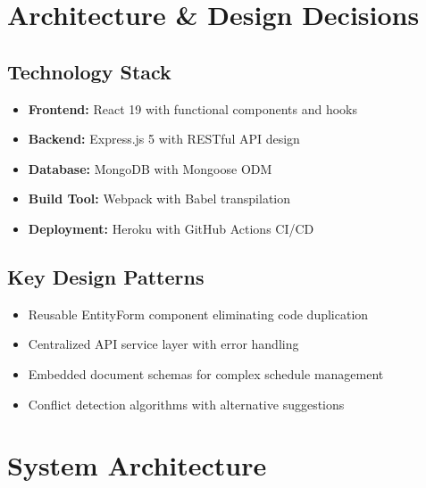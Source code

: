 \documentclass[11pt,a4paper]{article}
\begin{document}
\section{Architecture \& Design Decisions}

\subsection{Technology Stack}
\begin{itemize}
    \item \textbf{Frontend:} React 19 with functional components and hooks
    \item \textbf{Backend:} Express.js 5 with RESTful API design
    \item \textbf{Database:} MongoDB with Mongoose ODM
    \item \textbf{Build Tool:} Webpack with Babel transpilation
    \item \textbf{Deployment:} Heroku with GitHub Actions CI/CD
\end{itemize}

\subsection{Key Design Patterns}
\begin{itemize}
    \item Reusable EntityForm component eliminating code duplication
    \item Centralized API service layer with error handling
    \item Embedded document schemas for complex schedule management
    \item Conflict detection algorithms with alternative suggestions
\end{itemize}

\section{System Architecture}
\end{document}

